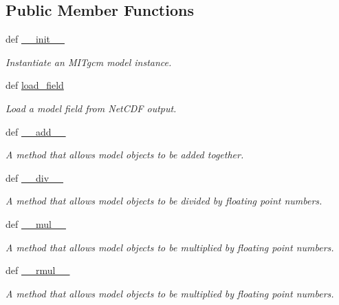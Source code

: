 \subsection*{Public Member Functions}
\begin{DoxyCompactItemize}
\item 
def \hyperlink{classmitgcm_1_1Simulation_a70d5c97bfc092a294646a5925034361b}{\+\_\+\+\_\+init\+\_\+\+\_\+}
\begin{DoxyCompactList}\small\item\em Instantiate an M\+I\+Tgcm model instance. \end{DoxyCompactList}\item 
def \hyperlink{classmitgcm_1_1Simulation_aec2a4455be8979b567bc48da293ab839}{load\+\_\+field}
\begin{DoxyCompactList}\small\item\em Load a model field from Net\+C\+D\+F output. \end{DoxyCompactList}\item 
def \hyperlink{classmitgcm_1_1Simulation_a22e4f56b5b282a40a296633ab6d8b337}{\+\_\+\+\_\+add\+\_\+\+\_\+}
\begin{DoxyCompactList}\small\item\em A method that allows model objects to be added together. \end{DoxyCompactList}\item 
def \hyperlink{classmitgcm_1_1Simulation_a375ddd33aeb39e510d0706d81d0f2f76}{\+\_\+\+\_\+div\+\_\+\+\_\+}
\begin{DoxyCompactList}\small\item\em A method that allows model objects to be divided by floating point numbers. \end{DoxyCompactList}\item 
def \hyperlink{classmitgcm_1_1Simulation_adb8e8981a1736b05b0031d6fb9fc9628}{\+\_\+\+\_\+mul\+\_\+\+\_\+}
\begin{DoxyCompactList}\small\item\em A method that allows model objects to be multiplied by floating point numbers. \end{DoxyCompactList}\item 
def \hyperlink{classmitgcm_1_1Simulation_aa5ac1d2836904c76b19dc0a13de0145d}{\+\_\+\+\_\+rmul\+\_\+\+\_\+}
\begin{DoxyCompactList}\small\item\em A method that allows model objects to be multiplied by floating point numbers. \end{DoxyCompactList}\end{DoxyCompactItemize}
